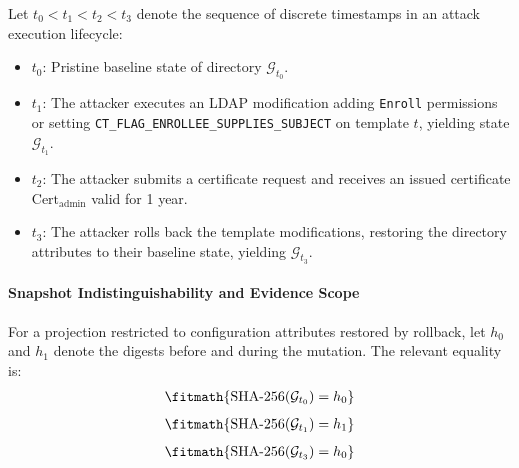\begin{definition}
Let $t_0 < t_1 < t_2 < t_3$ denote the sequence of discrete timestamps in an attack execution lifecycle:
\begin{itemize}
    \item $t_0$: Pristine baseline state of directory $\mathcal{G}_{t_0}$.
    \item $t_1$: The attacker executes an LDAP modification adding \texttt{Enroll} permissions or setting \texttt{CT\_FLAG\_ENROLLEE\_SUPPLIES\_SUBJECT} on template $t$, yielding state $\mathcal{G}_{t_1}$.
    \item $t_2$: The attacker submits a certificate request and receives an issued certificate $\text{Cert}_{\text{admin}}$ valid for 1 year.
    \item $t_3$: The attacker rolls back the template modifications, restoring the directory attributes to their baseline state, yielding $\mathcal{G}_{t_3}$.
\end{itemize}
\end{definition}

\paragraph{Snapshot Indistinguishability and Evidence Scope}
For a projection restricted to configuration attributes restored by rollback, let $h_0$ and $h_1$ denote the digests before and during the mutation. The relevant equality is:
\begin{equation}
\fitmath{\begin{gathered}\text{SHA-256}(\mathcal{G}_{t_0}) = h_0\end{gathered}}
\end{equation}
\begin{equation}
\fitmath{\begin{gathered}\text{SHA-256}(\mathcal{G}_{t_1}) = h_1\end{gathered}}
\end{equation}
\begin{equation}
\fitmath{\begin{gathered}\text{SHA-256}(\mathcal{G}_{t_3}) = h_0\end{gathered}}
\end{equation}

